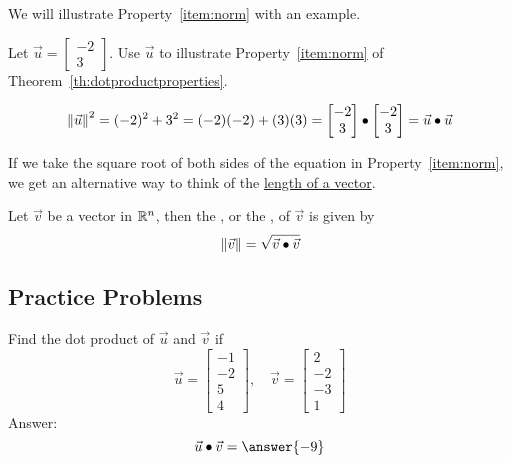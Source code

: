 \documentclass{ximera}
\begin{document}
We will illustrate Property~\ref{item:norm} with an example.
\begin{example}\label{ex:exprop6}
  Let $\vec{u}=\begin{bmatrix}-2\\3\end{bmatrix}$.  Use $\vec{u}$ to illustrate Property~\ref{item:norm} of Theorem~\ref{th:dotproductproperties}.
  \begin{explanation}
   
  $$\left\|\vec{u}\right\|^2=(-2)^2+3^2=(-2)(-2)+(3)(3)=\begin{bmatrix}-2\\3\end{bmatrix}\bullet\begin{bmatrix}-2\\3\end{bmatrix}=\vec{u}\bullet\vec{u}$$
  \end{explanation}
\end{example}
 
If we take the square root of both sides of the equation in Property~\ref{item:norm}, we get an alternative way to think of the \href{https://ximera.osu.edu/oerlinalg/LinearAlgebra/VEC-0020/main}{length of a vector}.
 
\begin{corollary}\label{cor:length_via_dotprod}
    Let $\vec{v}$ be a vector in $\mathbb{R}^n$, then the , or the , of $\vec{v}$ is given by
\begin{equation*} \label{eq:norm_dotp}
\left\|\vec{v}\right\|=\sqrt{\vec{v} \bullet \vec{v}}
\end{equation*}
\end{corollary}
 
\subsection*{Practice Problems}
 
\begin{problem}\label{prob:dotproduct1}
Find the dot product of $\vec{u}$ and $\vec{v}$ if
  $$\vec{u}=\begin{bmatrix}-1\\-2\\5\\4\end{bmatrix},\quad \vec{v}=\begin{bmatrix}2\\-2\\-3\\1\end{bmatrix}$$
  Answer:
  $$\vec{u} \dotp \vec{v} = \answer{-9}$$
\end{problem}
 
\end{document}
